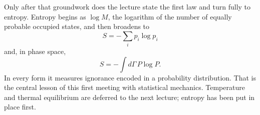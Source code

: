 Only after that groundwork does the lecture state the first law and turn fully to entropy. Entropy begins as \(\log M\), the logarithm of the number of equally probable occupied states, and then broadens to
\[
S=-\sum_i p_i\log p_i
\]
and, in phase space,
\[
S=-\int d\Gamma\,P\log P.
\]
In every form it measures ignorance encoded in a probability distribution. That is the central lesson of this first meeting with statistical mechanics. Temperature and thermal equilibrium are deferred to the next lecture; entropy has been put in place first.